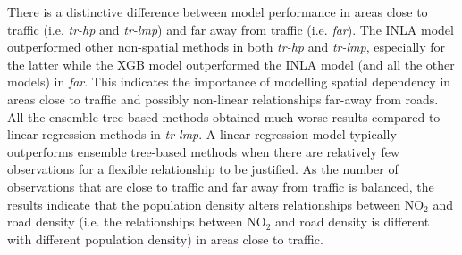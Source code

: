 \documentclass{article}
\begin{document}
There is a distinctive difference between model performance in areas close to traffic (i.e. \textit{tr-hp} and \textit{tr-lmp}) and far away from traffic (i.e. \textit{far}). The INLA model outperformed other non-spatial methods in both \textit{tr-hp} and \textit{tr-lmp}, especially for the latter while the XGB model outperformed the INLA model (and all the other models) in \textit{far}. This indicates the importance of modelling spatial dependency in areas close to traffic and possibly non-linear relationships far-away from roads. All the ensemble tree-based methods obtained much worse results compared to linear regression methods in \textit{tr-lmp}. A linear regression model typically outperforms ensemble tree-based methods when there are relatively few observations for a flexible relationship to be justified. As the number of observations that are close to traffic and far away from traffic is balanced, the results indicate that the population density alters relationships between NO$_2$ and road density (i.e. the relationships between NO$_2$ and road density is different with different population density) in areas close to traffic. 
\end{document}

